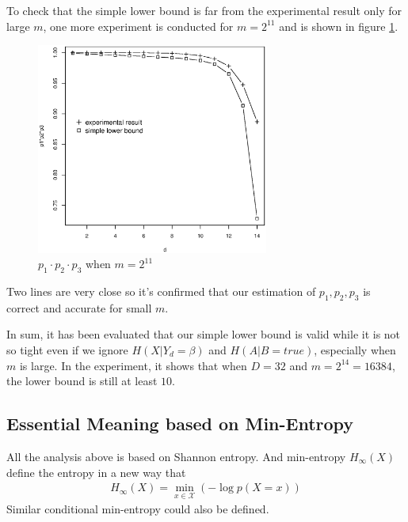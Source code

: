 \documentclass[10pt, conference, compsocconf]{IEEEtran}
\begin{document}
		To check that the simple lower bound is far from the experimental
		result only for large $m$, one more experiment is conducted
		for $m = 2^{11}$ and is shown in figure \ref{p11}.
		\begin{figure}[!t]
		\centering
		\includegraphics[width=3in]{p11.eps}
		\caption{$p_1 \cdot p_2 \cdot p_3$ when $m = 2^{11}$}\label{p11}
		\end{figure}
		
		Two lines are very close so it's confirmed that our estimation
		of $p_1, p_2, p_3$ is correct and accurate for small $m$.
		
		In sum, it has been evaluated that our simple lower bound
		is valid while it is not so tight even if we ignore
		$H(X | Y_d = \beta)$ and $H(A | B = true)$, especially
		when $m$ is large. In the experiment,
		it shows that when $D = 32$ and $m = 2^{14} = 16384$, the lower bound
		is still at least $10$.

\subsection{Essential Meaning based on Min-Entropy}
	All the analysis above is based on Shannon entropy.
	And min-entropy $H_\infty(X)$ define the entropy in a new way that
	\begin{align*}
		H_\infty(X) = \min_{x \in \mathcal X} \left(-\log p\left(X = x\right) \right)
	\end{align*}
	Similar conditional min-entropy could also be defined.
	
\end{document}
